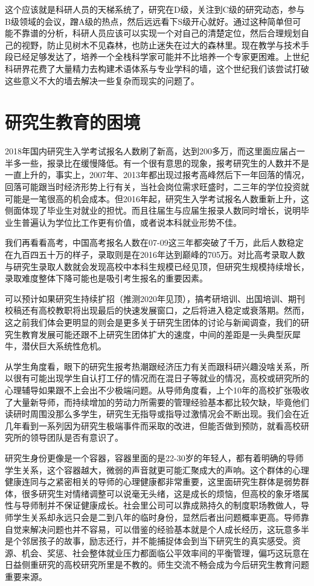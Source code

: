 \documentclass[]{tufte-book}
\begin{document}
这个应该就是科研人员的天梯系统了，研究在D级，关注到C级的研究动态，参与B级领域的会议，蹭A级的热点，然后远远看下S级开心就好。通过这种简单但可能不靠谱的分析，科研人员应该可以实现一个对自己的清楚定位，然后合理规划自己的视野，防止见树木不见森林，也防止迷失在过大的森林里。现在教学与技术手段已经足够发达了，培养一个全栈科学家可能并不比培养一个专家更困难。上世纪科研界花费了大量精力去构建术语体系与专业学科的墙，这个世纪我们该尝试打破这些意义不大的墙去解决一些复杂而现实的问题了。

\hypertarget{ux7814ux7a76ux751fux6559ux80b2ux7684ux56f0ux5883}{%
\section{研究生教育的困境}\label{ux7814ux7a76ux751fux6559ux80b2ux7684ux56f0ux5883}}

2018年国内研究生入学考试报名人数刷了新高，达到200多万，而这里面应届占一半多一些，报录比在缓慢降低。有一个很有意思的现象，报考研究生的人数并不是一直上升的，事实上，2007年、2013年都出现过报考高峰然后下一年回落的情况，回落可能跟当时经济形势上行有关，当社会岗位需求旺盛时，二三年的学位投资就可能是一笔很高的机会成本。但2016年起，研究生入学考试报名人数重新上升，这侧面体现了毕业生对就业的担忧。而且往届生与应届生报录人数同时增长，说明毕业生普遍认为学位比工作更有价值，或者说本科就业形势不佳。

我们再看看高考，中国高考报名人数在07-09这三年都突破了千万，此后人数稳定在九百四五十万的样子，录取则是在2016年达到巅峰的705万。对比高考录取人数与研究生录取人数就会发现高校中本科生规模已经见顶，但研究生规模持续增长，录取难度整体下降可能也是吸引考生报名的重要因素。

可以预计如果研究生持续扩招（推测2020年见顶），搞考研培训、出国培训、期刊校稿还有高校教职将出现最后的快速发展窗口，之后将进入稳定或衰落期。然而，这之前我们体会更明显的则会是更多关于研究生团体的讨论与新闻调查，我们的研究生教育发展可能还跟不上研究生团体扩大的速度，中间的差距是一头典型灰犀牛，潜伏巨大系统性危机。

从学生角度看，眼下的研究生报考热潮跟经济压力有关而跟科研兴趣没啥关系，所以很有可能出现学生自认打工仔的情况而在混日子等就业的情况，高校或研究所的心理辅导如果跟不上会出不少极端问题。从导师角度看，上个10年的高校扩张吸收了大量新导师，而持续增加的劳动力所需要的管理经验基本都比较欠缺，毕竟他们读研时周围没那么多学生，研究生无指导或指导过激情况会不断出现。我们会在近几年看到一系列因为研究生极端事件而采取的改进，但能否做到预防，就看高校研究所的领导团队是否有意识了。

研究生身份更像是一个容器，容器里面的是22-30岁的年轻人，都有着明确的导师学生关系，这个容器越大，微弱的声音就更可能汇聚成大的声响。这个群体的心理健康连同与之紧密相关的导师的心理健康都非常重要，这里面研究生群体是弱势群体，很多研究生对情绪调整可以说毫无头绪，这是成长的烦恼，但高校的象牙塔属性与导师制并不保证健康成长。社会里公司可以靠成熟持久的制度职场教做人，导师学生关系却永远只会是二到八年的临时身份，显然后者出问题概率更高。导师靠自觉来解决问题也并不容易，可以借鉴的经验基本就是个人成长经历，这玩意多半是个邻居孩子的故事，励志还行，并不能捕捉体会到当下研究生的真实感受。资源、机会、奖惩、社会整体就业压力都面临公平效率间的平衡管理，偏巧这玩意在日益侧重研究的高校研究所里是不教的。师生交流不畅会成为今后研究生教育问题重要来源。
\end{document}
